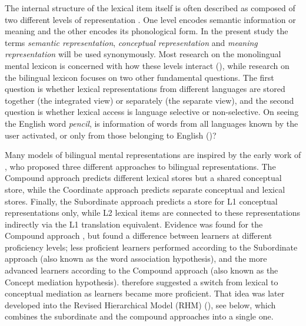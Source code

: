 \documentclass[output=paper,colorlinks,citecolor=brown,nonflat]{langsci/langscibook}
\begin{document}
The internal structure of the lexical item itself is often described as composed of two different levels of representation \citep{Levelt1989}. One level encodes semantic information or meaning and the other encodes its phonological form. In the present study the terms \textit{semantic representation}, \textit{conceptual representation} and \textit{meaning representation} will be used synonymously. Most research on the monolingual mental lexicon is concerned with how these levels interact (\citealt{DellOSeaghdha1991, LeveltEtAl1991Picture, LeveltEtAl1991Reply, DellOSeaghdha1992, Levelt1992}), while research on the bilingual lexicon focuses on two other fundamental questions. The first question is whether lexical representations from different languages are stored together (the integrated view) or separately (the separate view), and the second question is whether lexical access is language selective or non-selective. On seeing the English word \textit{pencil}, is information of words from all languages known by the user activated, or only from those belonging to English (\citealt{Weinreich1953, SánchezCasasEtAl1992, Poulisse1997, DijkstraVanHeuven1998, VanHeuvenEtAl1998, DijkstraVanHeuven2002, Dijkstra2003, LemhöferDijkstra2004, LemhöferEtAl2004, Costa2005, Dijkstra2005, KrollDeGroot2005, LaHeij2005, DijkstraEtAl2010, KrollEtAl2010, VanHeuvenEtAl2011, DeAngelisEtAl2015})?

Many models of bilingual mental representations are inspired by the early work of \citet{Weinreich1953}, who proposed three different approaches to bilingual representations. The Compound approach predicts different lexical stores but a shared conceptual store, while the Coordinate approach predicts separate conceptual and lexical stores. Finally, the Subordinate approach predicts a store for L1 conceptual representations only, while L2 lexical items are connected to these representations indirectly via the L1 translation equivalent. Evidence was found for the Compound approach \citep{PotterEtAl1984}, but \citet{KrollCurley1988} found a difference between learners at different proficiency levels; less proficient learners performed according to the Subordinate approach (also known as the word association hypothesis), and the more advanced learners according to the Compound approach (also known as the Concept mediation hypothesis). \citeauthor{KrollCurley1988} therefore suggested a switch from lexical to conceptual mediation as learners became more proficient. That idea was later developed into the Revised Hierarchical Model (RHM) (\citealt{KrollStewart1994, KrollEtAl2010}), see  below, which combines the subordinate and the compound approaches into a single one.
\end{document}
